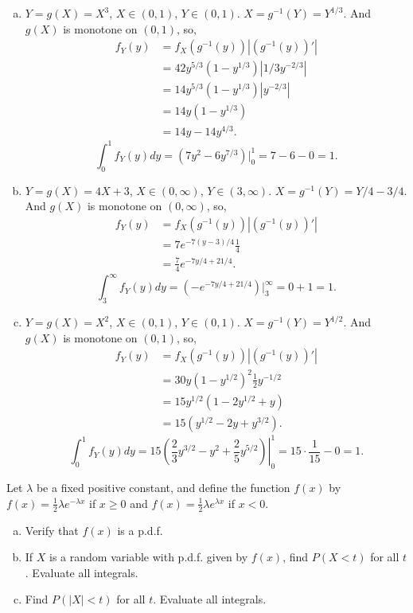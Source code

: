 \documentclass[14pt]{elegantbook}
\begin{document}
    \begin{solution}
        \begin{enumerate}[(a)]
            \item $Y=g(X)=X^3$, $X\in(0,1)$, $Y\in(0,1)$. $X=g^{-1}(Y)=Y^{1/3}$. And $g(X)$ is monotone on $(0, 1)$, so, 
            \begin{align*}
                f_Y(y)&=f_X(g^{-1}(y))|(g^{-1}(y))'|\\
                &=42y^{5/3}\left(1-y^{1/3}\right)|1/3y^{-2/3}|\\
                &=14y^{5/3}\left(1-y^{1/3}\right)|y^{-2/3}|\\
                &=14y\left(1-y^{1/3}\right)\\
                &=14y-14y^{4/3}. 
            \end{align*}
            \[\int_0^1f_Y(y)d y=(7y^2-6y^{7/3})\big|_{0}^1=7-6-0=1. \]
            \item $Y=g(X)=4X+3$, $X\in(0,\infty)$, $Y\in(3,\infty)$. $X=g^{-1}(Y)=Y/4-3/4$. And $g(X)$ is monotone on $(0, \infty)$, so, 
            \begin{align*}
                f_Y(y)&=f_X(g^{-1}(y))|(g^{-1}(y))'|\\
                &=7e^{-7(y-3)/4}\frac{1}{4}\\
                &=\frac{7}{4}e^{-7y/4+21/4}. 
            \end{align*}
            \[\int_3^\infty f_Y(y)d y=(-e^{-7y/4+21/4})\big|_{3}^\infty=0+1=1. \]
            \item $Y=g(X)=X^2$, $X\in(0,1)$, $Y\in(0,1)$. $X=g^{-1}(Y)=Y^{1/2}$. And $g(X)$ is monotone on $(0, 1)$, so, 
            \begin{align*}
                f_Y(y)&=f_X(g^{-1}(y))|(g^{-1}(y))'|\\
                &=30y(1-y^{1/2})^2\frac{1}{2}y^{-1/2}\\
                &=15y^{1/2}(1-2y^{1/2}+y)\\
                &=15(y^{1/2}-2y+y^{3/2}).
            \end{align*}
            \[\int_0^1 f_Y(y)d y=\left.15\left(\frac{2}{3}y^{3/2}-y^2+\frac{2}{5}y^{5/2}\right)\right|_{0}^1=15\cdot\frac{1}{15}-0=1. \]
        \end{enumerate}
    \end{solution}

    \setcounter{exer}{3}
    \begin{exercise}
        Let $\lambda$ be a fixed positive constant, and define the function $f(x)$ by $f(x)=\frac{1}{2}\lambda e^{-\lambda x}$ if $x\geq 0$ and $f(x)=\frac{1}{2}\lambda e^{\lambda x}$ if $x<0$. 
        \begin{enumerate}[(a)]
            \item Verify that $f(x)$ is a p.d.f. 
            \item If $X$ is a random variable with p.d.f. given by $f(x)$, find $P(X<t)$ for all $t$. Evaluate all integrals. 
            \item Find $P(|X|<t)$ for all $t$. Evaluate all integrals. 
        \end{enumerate}
    \end{exercise}
\end{document}
